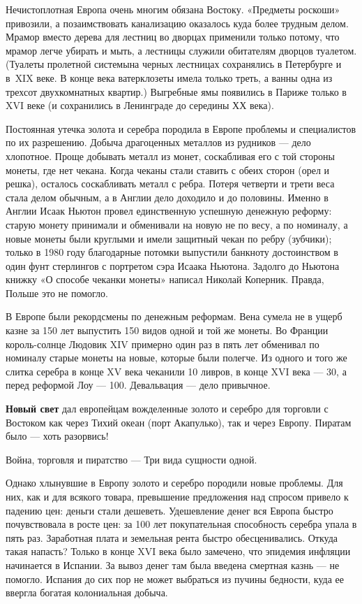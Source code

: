 Нечистоплотная Европа очень многим обязана Востоку. «Предметы роскоши» привозили, а позаимствовать канализацию оказалось
куда более трудным делом. Мрамор вместо дерева для лестниц во дворцах применили только потому, что мрамор легче убирать
и мыть, а лестницы служили обитателям дворцов туалетом. (Туалеты \flqq пролетной системы\frqq на
черных лестницах сохранялись в Петербурге и в~\foreignlanguage{english}{XIX} веке. В конце века ватерклозеты имела
только треть, а ванны одна из трехсот двухкомнатных квартир.) Выгребные ямы появились в Париже только в
\foreignlanguage{english}{XVI} веке (и сохранились в Ленинграде до середины ХХ века).

Постоянная утечка золота и серебра породила в Европе проблемы и специалистов по их разрешению. Добыча драгоценных
металлов из рудников — дело хлопотное. Проще добывать металл из монет, соскабливая его с той стороны монеты, где нет
чекана. Когда чеканы стали ставить с обеих сторон (орел и решка), осталось соскабливать металл с ребра. Потеря четверти
и трети веса стала делом обычным, а в Англии дело доходило и до половины. Именно в Англии Исаак Ньютон провел
единственную успешную денежную реформу: старую монету принимали и обменивали на новую не по весу, а по номиналу, а
новые монеты были круглыми и имели защитный чекан по ребру (зубчики); только в 1980 году благодарные потомки выпустили
банкноту достоинством в один фунт стерлингов с портретом сэра Исаака Ньютона. Задолго до Ньютона книжку «О способе
чеканки монеты» написал Николай Коперник. Правда, Польше это не помогло.

В Европе были рекордсмены по денежным реформам. Вена сумела не в ущерб казне за 150 лет выпустить 150 видов одной и той
же монеты. Во Франции король-солнце Людовик \foreignlanguage{english}{XIV} примерно один раз в пять лет обменивал по
номиналу старые монеты на новые, которые были полегче. Из одного и того же слитка серебра в конце
\foreignlanguage{english}{XV} века чеканили 10 ливров, в конце \foreignlanguage{english}{XVI} века — 30, а перед
реформой Лоу — 100. Девальвация — дело привычное.

\textbf{Новый свет }дал европейцам вожделенные золото и серебро для торговли с Востоком как через Тихий океан (порт
Акапулько), так и через Европу. Пиратам было — хоть разорвись!

Война, торговля и пиратство — \newline
Три вида сущности одной.

Однако хлынувшие в Европу золото и серебро породили новые проблемы. Для них, как и для всякого товара, превышение
предложения над спросом привело к падению цен: деньги стали дешеветь. Удешевление денег вся Европа быстро почувствовала
в росте цен: за 100 лет покупательная способность серебра упала в пять раз. Заработная плата и земельная рента быстро
обесценивались. Откуда такая напасть? Только в конце \foreignlanguage{english}{XVI} века было замечено, что эпидемия
инфляции начинается в Испании. За вывоз денег там была введена смертная казнь — не помогло. Испания до сих пор не может
выбраться из пучины бедности, куда ее ввергла богатая колониальная добыча.

